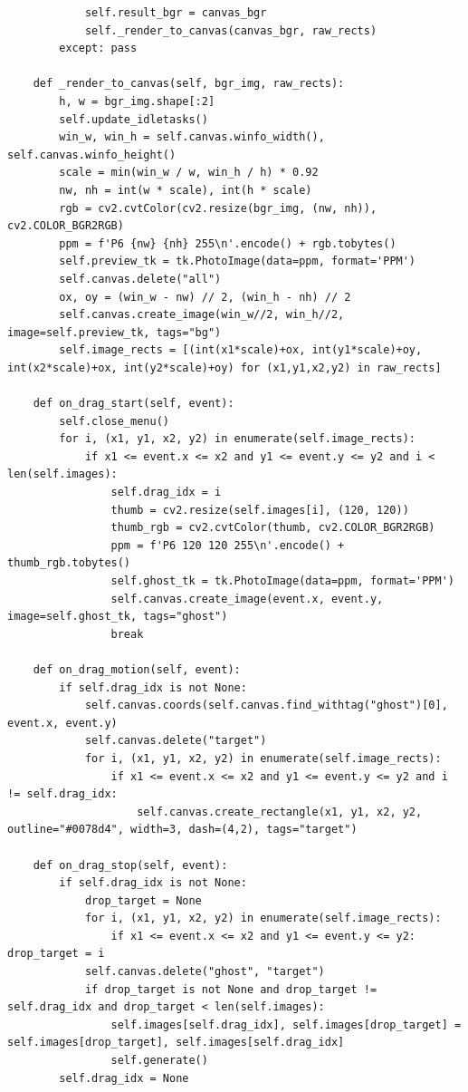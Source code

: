 \documentclass[a4paper]{article}
\begin{document}
\begin{verbatim}
            self.result_bgr = canvas_bgr
            self._render_to_canvas(canvas_bgr, raw_rects)
        except: pass

    def _render_to_canvas(self, bgr_img, raw_rects):
        h, w = bgr_img.shape[:2]
        self.update_idletasks()
        win_w, win_h = self.canvas.winfo_width(), self.canvas.winfo_height()
        scale = min(win_w / w, win_h / h) * 0.92
        nw, nh = int(w * scale), int(h * scale)
        rgb = cv2.cvtColor(cv2.resize(bgr_img, (nw, nh)), cv2.COLOR_BGR2RGB)
        ppm = f'P6 {nw} {nh} 255\n'.encode() + rgb.tobytes()
        self.preview_tk = tk.PhotoImage(data=ppm, format='PPM')
        self.canvas.delete("all")
        ox, oy = (win_w - nw) // 2, (win_h - nh) // 2
        self.canvas.create_image(win_w//2, win_h//2, image=self.preview_tk, tags="bg")
        self.image_rects = [(int(x1*scale)+ox, int(y1*scale)+oy, int(x2*scale)+ox, int(y2*scale)+oy) for (x1,y1,x2,y2) in raw_rects]

    def on_drag_start(self, event):
        self.close_menu()
        for i, (x1, y1, x2, y2) in enumerate(self.image_rects):
            if x1 <= event.x <= x2 and y1 <= event.y <= y2 and i < len(self.images):
                self.drag_idx = i
                thumb = cv2.resize(self.images[i], (120, 120))
                thumb_rgb = cv2.cvtColor(thumb, cv2.COLOR_BGR2RGB)
                ppm = f'P6 120 120 255\n'.encode() + thumb_rgb.tobytes()
                self.ghost_tk = tk.PhotoImage(data=ppm, format='PPM')
                self.canvas.create_image(event.x, event.y, image=self.ghost_tk, tags="ghost")
                break

    def on_drag_motion(self, event):
        if self.drag_idx is not None:
            self.canvas.coords(self.canvas.find_withtag("ghost")[0], event.x, event.y)
            self.canvas.delete("target")
            for i, (x1, y1, x2, y2) in enumerate(self.image_rects):
                if x1 <= event.x <= x2 and y1 <= event.y <= y2 and i != self.drag_idx:
                    self.canvas.create_rectangle(x1, y1, x2, y2, outline="#0078d4", width=3, dash=(4,2), tags="target")

    def on_drag_stop(self, event):
        if self.drag_idx is not None:
            drop_target = None
            for i, (x1, y1, x2, y2) in enumerate(self.image_rects):
                if x1 <= event.x <= x2 and y1 <= event.y <= y2: drop_target = i
            self.canvas.delete("ghost", "target")
            if drop_target is not None and drop_target != self.drag_idx and drop_target < len(self.images):
                self.images[self.drag_idx], self.images[drop_target] = self.images[drop_target], self.images[self.drag_idx]
                self.generate()
        self.drag_idx = None


\end{verbatim}
\end{document}
